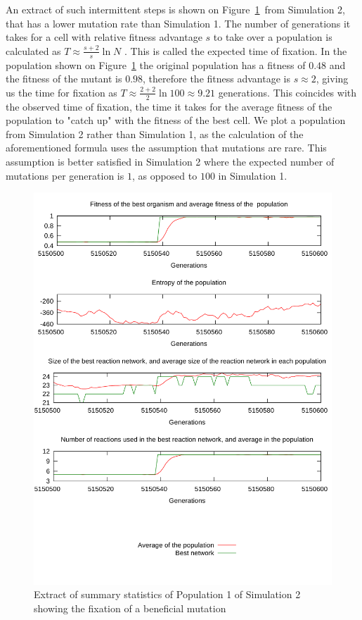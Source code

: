 \documentclass[a4paper,12pt]{article}
\begin{document}
An extract of such intermittent steps is shown on Figure~\ref{fig:fixation}~from Simulation 2, that has a lower mutation rate than Simulation 1. The number of generations it takes for a cell with relative fitness advantage $s$ to take over a population is calculated as $T \approx \frac{s+2}{s}\ln N$  \cite{barteklecture}. This is called the expected time of fixation. In the population shown on Figure~\ref{fig:fixation} the original population has a fitness of $0.48$ and the fitness of the mutant is $0.98$, therefore the fitness advantage is $s\approx2$, giving us the time for fixation as $T\approx \frac{2+2}{2}\ln 100 \approx 9.21$ generations. This coincides with the observed time of fixation, the time it takes for the average fitness of the population to "catch up" with the fitness of the best cell. We plot a population from Simulation 2 rather than Simulation 1, as the calculation of the aforementioned formula uses the assumption that mutations are rare. This assumption is better satisfied in Simulation 2 where the expected number of mutations per generation is $1$, as opposed to $100$ in Simulation 1.

\begin{figure}[htpb]
	\centering
	\includegraphics[width=0.8\linewidth]{fixation.pdf}
	\caption{Extract of summary statistics of Population 1 of Simulation 2 showing the fixation of a beneficial mutation}
	\label{fig:fixation}
\end{figure}
\end{document}
